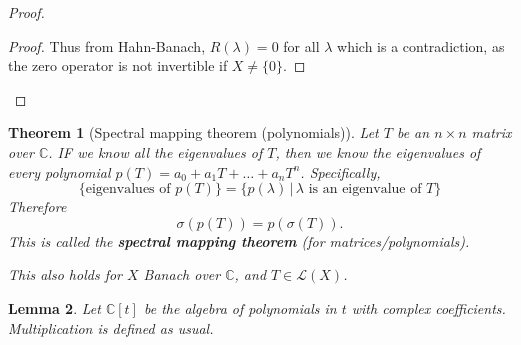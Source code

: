 \documentclass[10pt, oneside, reqno]{amsbook}
\theoremstyle{plain}%
\newtheorem{thm}{Theorem}[section]
\newtheorem{lem}[thm]{Lemma}
\theoremstyle{definition}
\theoremstyle{remark}
\newcommand{\given}{ \, | \,}
\newcommand{\Com}{\mathbb{C}}
\begin{document}
\begin{proof}
\begin{proof}
        Thus from Hahn-Banach, $R(\lambda) = 0$ for all $\lambda$ which is a contradiction, as the zero operator is not invertible if $X \neq \{ 0 \}$.   
    \end{proof}
\end{proof}

\begin{thm}[Spectral mapping theorem (polynomials)]
    Let $T$ be an $n \times n$ matrix over $\Com$.  IF we know all the eigenvalues of $T$, then we know the eigenvalues of every polynomial $p(T) = a_0 + a_1 T + \dots + a_n T^n$.  Specifically, \[
        \{ \text{eigenvalues of $p(T)$} \} = \{ p(\lambda) \given \text{$\lambda$ is an eigenvalue of $T$} \}
    \] Therefore \[
        \sigma(p(T)) = p(\sigma(T)).
    \]  This is called the \textbf{spectral mapping theorem} (for matrices/polynomials). 
    
    This also holds for $X$ Banach over $\Com$, and $T \in \mathcal L(X)$.
\end{thm}

\begin{lem}
    Let $\Com[t]$ be the algebra of polynomials in $t$ with complex coefficients.  Multiplication is defined as usual.
\end{lem}
\end{document}
